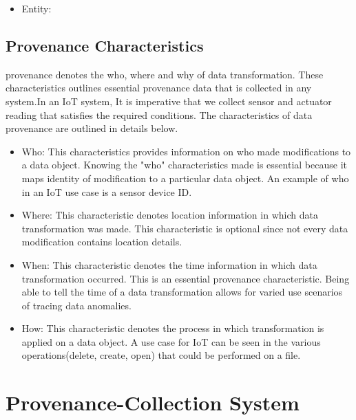 \begin{itemize}

\item Entity: 
\end{itemize}



\subsection{Provenance Characteristics}

provenance denotes the who, where and why of data transformation. These characteristics outlines essential provenance data that is collected in any system.In an IoT system, It is imperative that we collect sensor and actuator reading that satisfies the required conditions. The characteristics of data provenance are outlined in details below.


\begin{itemize}

\item Who: This characteristics provides information on who made modifications to a data object. Knowing the "who" characteristics made is essential because it maps identity of modification to a particular data object. An example of who in an IoT use case is a sensor device ID.

\item Where: This characteristic denotes location information in which data transformation was made. This characteristic is optional since not every data modification contains location details.

\item When: This characteristic denotes the time information in which data transformation occurred. This is an essential provenance characteristic. Being able to tell the time of a data transformation allows for varied use scenarios of tracing data anomalies.

\item How: This characteristic denotes the process in which transformation is applied on a data object. A use case for IoT can be seen in the various operations(delete, create, open) that could be performed on a file.

\end{itemize}







\section{Provenance-Collection System}


